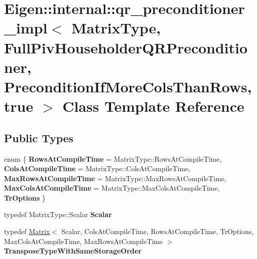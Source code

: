 \hypertarget{class_eigen_1_1internal_1_1qr__preconditioner__impl_3_01_matrix_type_00_01_full_piv_householder_0bfd000ff4c8127883e77da4144b4435}{}\section{Eigen\+::internal\+::qr\+\_\+preconditioner\+\_\+impl$<$ Matrix\+Type, Full\+Piv\+Householder\+Q\+R\+Preconditioner, Precondition\+If\+More\+Cols\+Than\+Rows, true $>$ Class Template Reference}
\label{class_eigen_1_1internal_1_1qr__preconditioner__impl_3_01_matrix_type_00_01_full_piv_householder_0bfd000ff4c8127883e77da4144b4435}
\subsection*{Public Types}
\begin{DoxyCompactItemize}
\item 
\mbox{\label{class_eigen_1_1internal_1_1qr__preconditioner__impl_3_01_matrix_type_00_01_full_piv_householder_0bfd000ff4c8127883e77da4144b4435_a22aff6516c48217bf7fe6948843e6e53}} 
enum \{ \newline
{\bfseries Rows\+At\+Compile\+Time} = Matrix\+Type\+::Rows\+At\+Compile\+Time, 
{\bfseries Cols\+At\+Compile\+Time} = Matrix\+Type\+::Cols\+At\+Compile\+Time, 
{\bfseries Max\+Rows\+At\+Compile\+Time} = Matrix\+Type\+::Max\+Rows\+At\+Compile\+Time, 
{\bfseries Max\+Cols\+At\+Compile\+Time} = Matrix\+Type\+::Max\+Cols\+At\+Compile\+Time, 
\newline
{\bfseries Tr\+Options}
 \}
\item 
\mbox{\label{class_eigen_1_1internal_1_1qr__preconditioner__impl_3_01_matrix_type_00_01_full_piv_householder_0bfd000ff4c8127883e77da4144b4435_ab4614d310274ec672b10bf51fee7caf5}} 
typedef Matrix\+Type\+::\+Scalar {\bfseries Scalar}
\item 
\mbox{\label{class_eigen_1_1internal_1_1qr__preconditioner__impl_3_01_matrix_type_00_01_full_piv_householder_0bfd000ff4c8127883e77da4144b4435_a1b7fe65d1a64c063e03f968ac201fc1a}} 
typedef \mbox{\hyperlink{class_eigen_1_1_matrix}{Matrix}}$<$ Scalar, Cols\+At\+Compile\+Time, Rows\+At\+Compile\+Time, Tr\+Options, Max\+Cols\+At\+Compile\+Time, Max\+Rows\+At\+Compile\+Time $>$ {\bfseries Transpose\+Type\+With\+Same\+Storage\+Order}
\end{DoxyCompactItemize}
